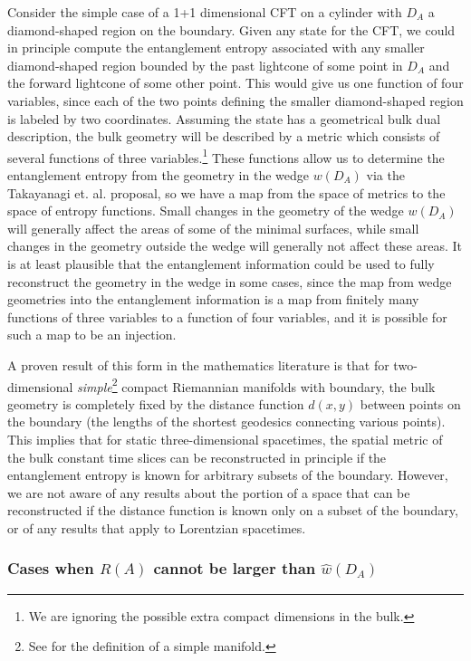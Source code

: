 \documentclass[12pt]{article}
\renewcommand{\(}{\left(}
\renewcommand{\)}{\right)}
\begin{document}
Consider the simple case of a 1+1 dimensional CFT on a cylinder with $D_A$ a diamond-shaped region on the boundary. Given any state for the CFT, we could in principle compute the entanglement entropy associated with any smaller diamond-shaped region bounded by the past lightcone of some point in $D_A$ and the forward lightcone of some other point. This would give us one function of four variables, since each of the two points defining the smaller diamond-shaped region is labeled by two coordinates. Assuming the state has a geometrical bulk dual description, the bulk geometry will be described by a metric which consists of several functions of three variables.\footnote{We are ignoring the possible extra compact dimensions in the bulk.} These functions allow us to determine the entanglement entropy from the geometry in the wedge $w(D_A)$ via the Takayanagi et. al. proposal, so we have a map from the space of metrics to the space of entropy functions. Small changes in the geometry of the wedge $w(D_A)$ will generally affect the areas of some of the minimal surfaces, while small changes in the geometry outside the wedge will generally not affect these areas. It is at least plausible that the entanglement information could be used to fully reconstruct the geometry in the wedge in some cases, since the map from wedge geometries into the entanglement information is a map from finitely many functions of three variables to a function of four variables, and it is possible for such a map to be an injection.

A proven result of this form in the mathematics literature \cite{pu} is that for two-dimensional {\it simple}\footnote{See \cite{pu} for the definition of a simple manifold.} compact Riemannian manifolds with boundary, the bulk geometry is completely fixed by the distance function $d(x,y)$ between points on the boundary (the lengths of the shortest geodesics connecting various points). This implies that for static three-dimensional spacetimes, the spatial metric of the bulk constant time slices can be reconstructed in principle if the entanglement entropy is known for arbitrary subsets of the boundary. However, we are not aware of any results about the portion of a space that can be reconstructed if the distance function is known only on a subset of the boundary, or of any results that apply to Lorentzian spacetimes.

\subsubsection*{Cases when $R(A)$ cannot be larger than $\hat{w}(D_A)$}
\end{document}
